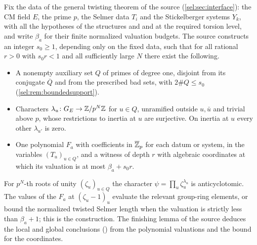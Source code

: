 Fix the data of the general twisting theorem of the source (\cref{sel:sec:interface}):
the CM field $E$, the prime $p$, the Selmer data $T_i$ and the Stickelberger systems $Y_k$,
with all the hypotheses of the structures  and
 and  at the required torsion level, and
write $\beta_a$ for their finite normalized valuation budgets. The source constructs an
integer $s_0\ge1$, depending only on the fixed data, such that for all rational $r>0$ with
$s_0r<1$ and all sufficiently large $N$ there exist the following.
\begin{itemize}
\item A nonempty auxiliary set $Q$ of primes of degree one, disjoint from its conjugate
  $\overline Q$ and from the prescribed bad sets, with $2\#Q\le s_0$
  (\cref{sel:rem:boundedsupport}).
\item Characters $\lambda_u\colon G_E\to\mathbb{Z}/p^N\mathbb{Z}$ for $u\in Q$, unramified outside
  $u,\bar u$ and trivial above $p$, whose restrictions to inertia at $u$ are surjective.
  On inertia at $u$ every other $\lambda_{u'}$ is zero.
\item One polynomial $F_a$ with coefficients in $\overline{\mathbb{Z}}_p$ for each datum or
  system, in the variables $(T_u)_{u\in Q}$, and a witness of depth $r$ with algebraic
  coordinates at which its valuation is at most $\beta_a+s_0r$.
\end{itemize}
For $p^N$-th roots of unity $(\zeta_u)_{u\in Q}$ the character
$\psi=\prod_u\zeta_u^{\lambda_u}$ is anticyclotomic. The values of the $F_a$ at
$(\zeta_u-1)_u$ evaluate the relevant group-ring elements, or bound the normalized
twisted Selmer length when the valuation is strictly less than $\beta_a+1$; this is the
 construction. The finishing lemma  of the
source deduces the local and global conclusions () from the polynomial
valuations and the bound for the coordinates.

